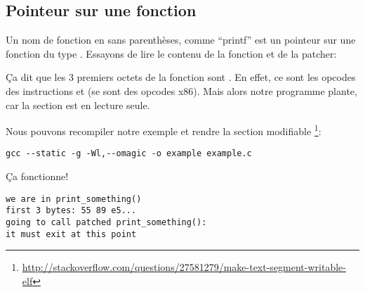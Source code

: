 \subsection{Pointeur sur une fonction}

Un nom de fonction en \CCpp sans parenthèses, comme ``printf'' est un pointeur sur
une fonction du type .
Essayons de lire le contenu de la fonction et de la patcher:



Ça dit que les 3 premiers octets de la fonction sont .
En effet, ce sont les opcodes des instructions  et 
(se sont des opcodes x86).
Mais alors notre programme plante, car la section  est en lecture seule.

Nous pouvons recompiler notre exemple et rendre la section  modifiable
\footnote{\url{http://stackoverflow.com/questions/27581279/make-text-segment-writable-elf}}:

\begin{lstlisting}
gcc --static -g -Wl,--omagic -o example example.c
\end{lstlisting}

Ça fonctionne!

\begin{lstlisting}
we are in print_something()
first 3 bytes: 55 89 e5...
going to call patched print_something():
it must exit at this point
\end{lstlisting}

